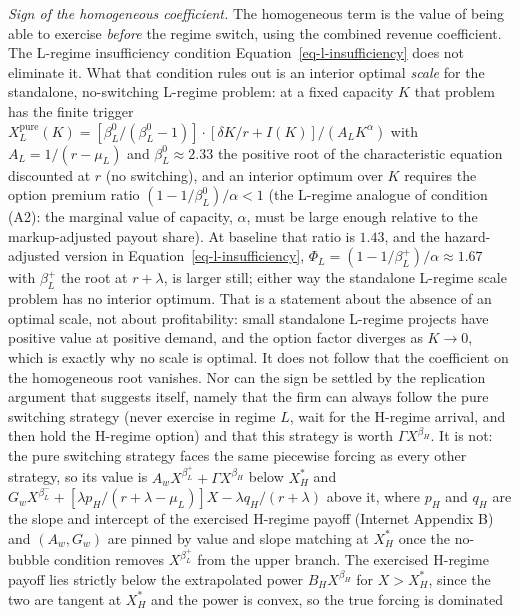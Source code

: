 \documentclass[
  11pt,
  letterpaper,
]{scrartcl}
\begin{document}
\emph{Sign of the homogeneous coefficient.} The homogeneous term is the
value of being able to exercise \emph{before} the regime switch, using
the combined revenue coefficient. The L-regime insufficiency condition
Equation~\ref{eq-l-insufficiency} does not eliminate it. What that
condition rules out is an interior optimal \emph{scale} for the
standalone, no-switching L-regime problem: at a fixed capacity \(K\)
that problem has the finite trigger
\(X_L^{\text{pure}}(K) = [\beta_L^0/(\beta_L^0 - 1)] \cdot [\delta K/r + I(K)]/(A_L K^\alpha)\)
with \(A_L = 1/(r - \mu_L)\) and \(\beta_L^0 \approx 2.33\) the positive
root of the characteristic equation discounted at \(r\) (no switching),
and an interior optimum over \(K\) requires the option premium ratio
\((1 - 1/\beta_L^0)/\alpha < 1\) (the L-regime analogue of condition
(A2): the marginal value of capacity, \(\alpha\), must be large enough
relative to the markup-adjusted payout share). At baseline that ratio is
\(1.43\), and the hazard-adjusted version in
Equation~\ref{eq-l-insufficiency},
\(\Phi_L = (1 - 1/\beta_L^+)/\alpha \approx 1.67\) with \(\beta_L^+\)
the root at \(r + \lambda\), is larger still; either way the standalone
L-regime scale problem has no interior optimum. That is a statement
about the absence of an optimal scale, not about profitability: small
standalone L-regime projects have positive value at positive demand, and
the option factor diverges as \(K \to 0\), which is exactly why no scale
is optimal. It does not follow that the coefficient on the homogeneous
root vanishes. Nor can the sign be settled by the replication argument
that suggests itself, namely that the firm can always follow the pure
switching strategy (never exercise in regime \(L\), wait for the
H-regime arrival, and then hold the H-regime option) and that this
strategy is worth \(\Gamma X^{\beta_H}\). It is not: the pure switching
strategy faces the same piecewise forcing as every other strategy, so
its value is \(A_w X^{\beta_L^+} + \Gamma X^{\beta_H}\) below \(X_H^*\)
and
\(G_w X^{\beta_L^-} + [\lambda p_H/(r + \lambda - \mu_L)] X - \lambda q_H/(r + \lambda)\)
above it, where \(p_H\) and \(q_H\) are the slope and intercept of the
exercised H-regime payoff (Internet Appendix B) and \((A_w, G_w)\) are
pinned by value and slope matching at \(X_H^*\) once the no-bubble
condition removes \(X^{\beta_L^+}\) from the upper branch. The exercised
H-regime payoff lies strictly below the extrapolated power
\(B_H X^{\beta_H}\) for \(X > X_H^*\), since the two are tangent at
\(X_H^*\) and the power is convex, so the true forcing is dominated
\end{document}
